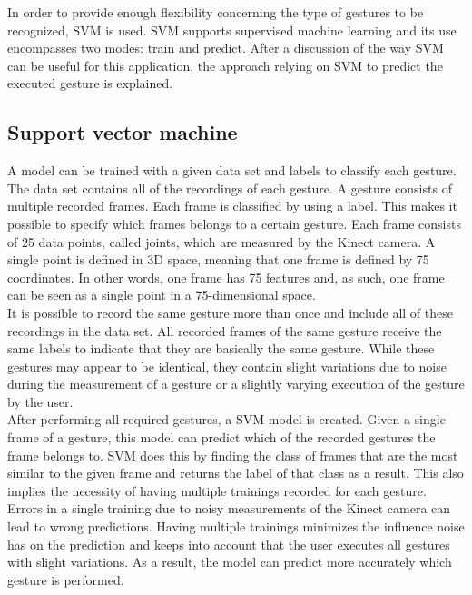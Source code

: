 In order to provide enough flexibility concerning the type of gestures to be recognized, SVM is used. SVM supports supervised machine learning and its use encompasses two modes: train and predict. After a discussion of the way SVM can be useful for this application, the approach relying on SVM to predict the executed gesture is explained.\\


\subsection{Support vector machine}

A model can be trained with a given data set and labels to classify each gesture. The data set contains all of the recordings of each gesture. A gesture consists of multiple recorded frames. Each frame is classified by using a label. This makes it possible to specify which frames belongs to a certain gesture. Each frame consists of 25 data points, called joints, which are measured by the Kinect camera. A single point is defined in 3D space, meaning that one frame is defined by 75 coordinates. In other words, one frame has 75 features and, as such, one frame can be seen as a single point in a 75-dimensional space.\\

It is possible to record the same gesture more than once and include all of these recordings in the data set. All recorded frames of the same gesture receive the same labels to indicate that they are basically the same gesture. While these gestures may appear to be identical, they contain slight variations due to noise during the measurement of a gesture or a slightly varying execution of the gesture by the user.\\

After performing all required gestures, a SVM model is created. Given a single frame of a gesture, this model can predict which of the recorded gestures the frame belongs to. SVM does this by finding the class of frames that are the most similar to the given frame and returns the label of that class as a result. This also implies the necessity of having multiple trainings recorded for each gesture. Errors in a single training due to noisy measurements of the Kinect camera can lead to wrong predictions. Having multiple trainings minimizes the influence noise has on the prediction and keeps into account that the user executes all gestures with slight variations. As a result, the model can predict more accurately which gesture is performed.\\


